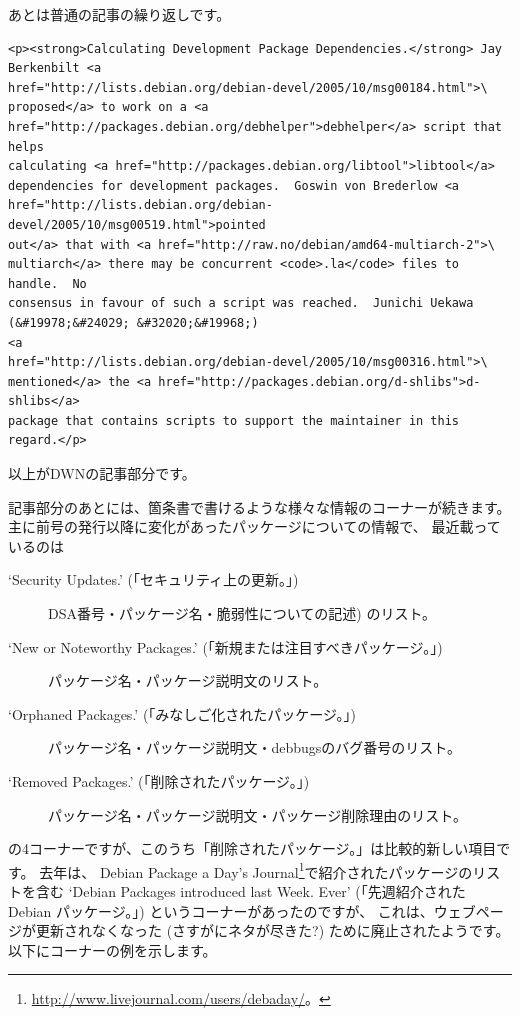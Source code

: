 \documentclass[mingoth,a4paper]{jsarticle}
\begin{document}
あとは普通の記事の繰り返しです。

\begin{verbatim}
<p><strong>Calculating Development Package Dependencies.</strong> Jay
Berkenbilt <a
href="http://lists.debian.org/debian-devel/2005/10/msg00184.html">\
proposed</a> to work on a <a
href="http://packages.debian.org/debhelper">debhelper</a> script that helps
calculating <a href="http://packages.debian.org/libtool">libtool</a>
dependencies for development packages.  Goswin von Brederlow <a
href="http://lists.debian.org/debian-devel/2005/10/msg00519.html">pointed
out</a> that with <a href="http://raw.no/debian/amd64-multiarch-2">\
multiarch</a> there may be concurrent <code>.la</code> files to handle.  No
consensus in favour of such a script was reached.  Junichi Uekawa (&#19978;&#24029; &#32020;&#19968;)
<a
href="http://lists.debian.org/debian-devel/2005/10/msg00316.html">\
mentioned</a> the <a href="http://packages.debian.org/d-shlibs">d-shlibs</a>
package that contains scripts to support the maintainer in this regard.</p>
\end{verbatim}

以上がDWNの記事部分です。

記事部分のあとには、箇条書で書けるような様々な情報のコーナーが続きます。
主に前号の発行以降に変化があったパッケージについての情報で、
最近載っているのは
\begin{description}
 \item[`Security Updates.' (「セキュリティ上の更新。」)]
   DSA番号・パッケージ名・脆弱性についての記述) のリスト。
 \item[`New or Noteworthy Packages.' (「新規または注目すべきパッケージ。」)]
   パッケージ名・パッケージ説明文のリスト。
 \item[`Orphaned Packages.' (「みなしご化されたパッケージ。」)]
   パッケージ名・パッケージ説明文・debbugsのバグ番号のリスト。
 \item[`Removed Packages.' (「削除されたパッケージ。」)]
   パッケージ名・パッケージ説明文・パッケージ削除理由のリスト。
\end{description}
の4コーナーですが、このうち「削除されたパッケージ。」は比較的新しい項目です。
去年は、
Debian Package a Day's Journal\footnote{\url{http://www.livejournal.com/users/debaday/}。}で紹介されたパッケージのリストを含む
`Debian Packages introduced last Week. Ever' (「先週紹介された Debian パッケージ。」) というコーナーがあったのですが、
これは、ウェブページが更新されなくなった (さすがにネタが尽きた?) ために廃止されたようです。
以下にコーナーの例を示します。
\end{document}
